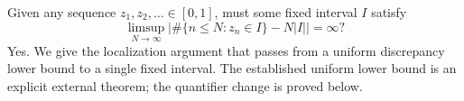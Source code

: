 Given any sequence $z_1,z_2,\ldots\in[0,1]$, must some fixed
interval $I$ satisfy
\[
 \limsup_{N\to\infty}
 \left|\#\{n\leq N:z_n\in I\}-N|I|\right|=\infty?
\]
Yes. We give the localization argument that passes from a
uniform discrepancy lower bound to a single fixed interval.
The established uniform lower bound is an explicit external
theorem; the quantifier change is proved below.
